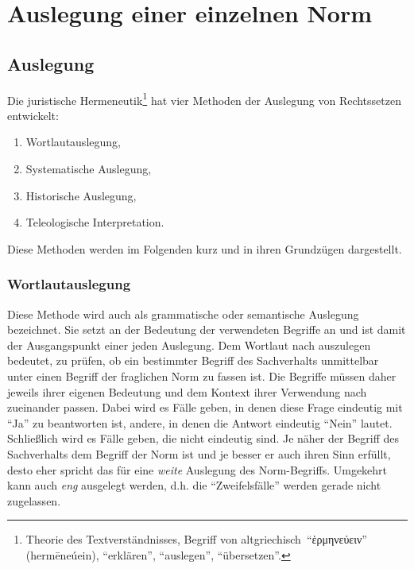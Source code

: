 \section{Auslegung einer einzelnen Norm}
\subsection{Auslegung}
Die juristische Hermeneutik\footnote{Theorie des Textverständnisses, Begriff von altgriechisch \enquote{ἑρμηνεύειν} (hermēneúein), \enquote{erklären}, \enquote{auslegen}, \enquote{übersetzen}.} hat vier Methoden der Auslegung von Rechtssetzen entwickelt:
\begin{enumerate}
\item Wortlautauslegung,
\item Systematische Auslegung,
\item Historische Auslegung,
\item Teleologische Interpretation.
\end{enumerate}

Diese Methoden werden im Folgenden kurz und in ihren Grundzügen dargestellt.

\subsubsection{Wortlautauslegung}
Diese Methode wird auch als grammatische oder semantische Auslegung bezeichnet.
Sie setzt an der Bedeutung der verwendeten Begriffe an und ist damit der Ausgangspunkt einer jeden Auslegung.
Dem Wortlaut nach auszulegen bedeutet, zu prüfen, ob ein bestimmter Begriff des Sachverhalts unmittelbar unter einen Begriff der fraglichen Norm zu fassen ist.
Die Begriffe müssen daher jeweils ihrer eigenen Bedeutung und dem Kontext ihrer Verwendung nach zueinander passen.
Dabei wird es Fälle geben, in denen diese Frage eindeutig mit \enquote{Ja} zu beantworten ist, andere, in denen die Antwort eindeutig \enquote{Nein} lautet.
Schließlich wird es Fälle geben, die nicht eindeutig sind.
Je näher der Begriff des Sachverhalts dem Begriff der Norm ist und je besser er auch ihren Sinn erfüllt, desto eher spricht das für eine \emph{weite} Auslegung des Norm-Begriffs.
Umgekehrt kann auch \emph{eng} ausgelegt werden, d.h. die \enquote{Zweifelsfälle} werden gerade nicht zugelassen.

